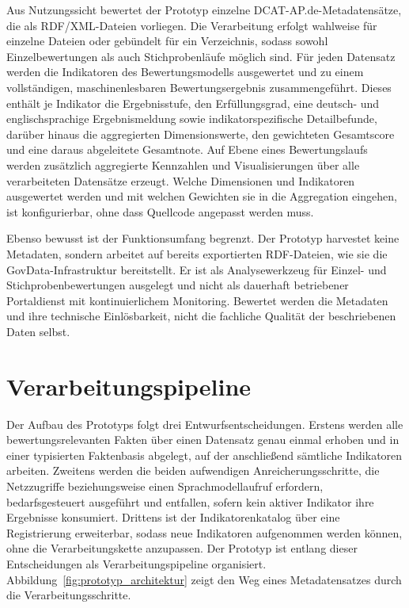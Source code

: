 Aus Nutzungssicht bewertet der Prototyp einzelne DCAT-AP.de-Metadatensätze, die als RDF/XML-Dateien vorliegen. Die Verarbeitung erfolgt wahlweise für einzelne Dateien oder gebündelt für ein Verzeichnis, sodass sowohl Einzelbewertungen als auch Stichprobenläufe möglich sind. Für jeden Datensatz werden die Indikatoren des Bewertungsmodells ausgewertet und zu einem vollständigen, maschinenlesbaren Bewertungsergebnis zusammengeführt. Dieses enthält je Indikator die Ergebnisstufe, den Erfüllungsgrad, eine deutsch- und englischsprachige Ergebnismeldung sowie indikatorspezifische Detailbefunde, darüber hinaus die aggregierten Dimensionswerte, den gewichteten Gesamtscore und eine daraus abgeleitete Gesamtnote. Auf Ebene eines Bewertungslaufs werden zusätzlich aggregierte Kennzahlen und Visualisierungen über alle verarbeiteten Datensätze erzeugt. Welche Dimensionen und Indikatoren ausgewertet werden und mit welchen Gewichten sie in die Aggregation eingehen, ist konfigurierbar, ohne dass Quellcode angepasst werden muss.

Ebenso bewusst ist der Funktionsumfang begrenzt. Der Prototyp harvestet keine Metadaten, sondern arbeitet auf bereits exportierten RDF-Dateien, wie sie die GovData-Infrastruktur bereitstellt. Er ist als Analysewerkzeug für Einzel- und Stichprobenbewertungen ausgelegt und nicht als dauerhaft betriebener Portaldienst mit kontinuierlichem Monitoring. Bewertet werden die Metadaten und ihre technische Einlösbarkeit, nicht die fachliche Qualität der beschriebenen Daten selbst.

\section{Verarbeitungspipeline}
\label{sec:architektur}

Der Aufbau des Prototyps folgt drei Entwurfsentscheidungen. Erstens werden alle bewertungsrelevanten Fakten über einen Datensatz genau einmal erhoben und in einer typisierten Faktenbasis abgelegt, auf der anschließend sämtliche Indikatoren arbeiten. Zweitens werden die beiden aufwendigen Anreicherungsschritte, die Netzzugriffe beziehungsweise einen Sprachmodellaufruf erfordern, bedarfsgesteuert ausgeführt und entfallen, sofern kein aktiver Indikator ihre Ergebnisse konsumiert. Drittens ist der Indikatorenkatalog über eine Registrierung erweiterbar, sodass neue Indikatoren aufgenommen werden können, ohne die Verarbeitungskette anzupassen. Der Prototyp ist entlang dieser Entscheidungen als Verarbeitungspipeline organisiert. Abbildung~\ref{fig:prototyp_architektur} zeigt den Weg eines Metadatensatzes durch die Verarbeitungsschritte.

